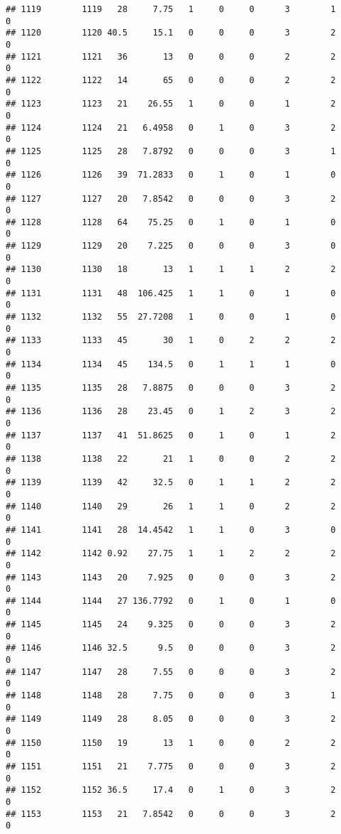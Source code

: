 \documentclass[
]{article}
\begin{document}
\begin{verbatim}
## 1119        1119   28     7.75   1     0     0      3        1         0
## 1120        1120 40.5     15.1   0     0     0      3        2         0
## 1121        1121   36       13   0     0     0      2        2         0
## 1122        1122   14       65   0     0     0      2        2         0
## 1123        1123   21    26.55   1     0     0      1        2         0
## 1124        1124   21   6.4958   0     1     0      3        2         0
## 1125        1125   28   7.8792   0     0     0      3        1         0
## 1126        1126   39  71.2833   0     1     0      1        0         0
## 1127        1127   20   7.8542   0     0     0      3        2         0
## 1128        1128   64    75.25   0     1     0      1        0         0
## 1129        1129   20    7.225   0     0     0      3        0         0
## 1130        1130   18       13   1     1     1      2        2         0
## 1131        1131   48  106.425   1     1     0      1        0         0
## 1132        1132   55  27.7208   1     0     0      1        0         0
## 1133        1133   45       30   1     0     2      2        2         0
## 1134        1134   45    134.5   0     1     1      1        0         0
## 1135        1135   28   7.8875   0     0     0      3        2         0
## 1136        1136   28    23.45   0     1     2      3        2         0
## 1137        1137   41  51.8625   0     1     0      1        2         0
## 1138        1138   22       21   1     0     0      2        2         0
## 1139        1139   42     32.5   0     1     1      2        2         0
## 1140        1140   29       26   1     1     0      2        2         0
## 1141        1141   28  14.4542   1     1     0      3        0         0
## 1142        1142 0.92    27.75   1     1     2      2        2         0
## 1143        1143   20    7.925   0     0     0      3        2         0
## 1144        1144   27 136.7792   0     1     0      1        0         0
## 1145        1145   24    9.325   0     0     0      3        2         0
## 1146        1146 32.5      9.5   0     0     0      3        2         0
## 1147        1147   28     7.55   0     0     0      3        2         0
## 1148        1148   28     7.75   0     0     0      3        1         0
## 1149        1149   28     8.05   0     0     0      3        2         0
## 1150        1150   19       13   1     0     0      2        2         0
## 1151        1151   21    7.775   0     0     0      3        2         0
## 1152        1152 36.5     17.4   0     1     0      3        2         0
## 1153        1153   21   7.8542   0     0     0      3        2         0

\end{verbatim}
\end{document}
